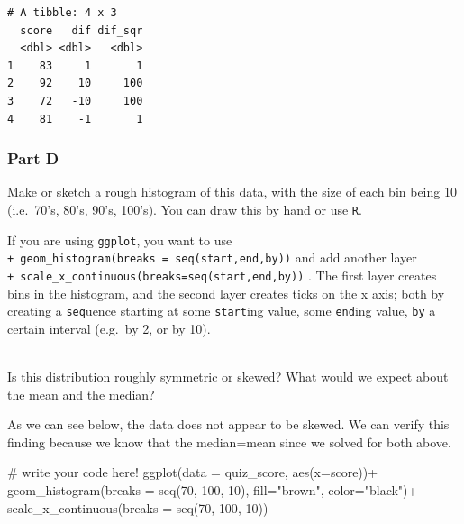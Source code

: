 \documentclass[
  letterpaper,
  DIV=11,
  numbers=noendperiod]{scrartcl}
\newenvironment{Shaded}{\begin{snugshade}}{\end{snugshade}}
\newcommand{\AttributeTok}[1]{\textcolor[rgb]{0.40,0.45,0.13}{#1}}
\newcommand{\CommentTok}[1]{\textcolor[rgb]{0.37,0.37,0.37}{#1}}
\newcommand{\DecValTok}[1]{\textcolor[rgb]{0.68,0.00,0.00}{#1}}
\newcommand{\FunctionTok}[1]{\textcolor[rgb]{0.28,0.35,0.67}{#1}}
\newcommand{\NormalTok}[1]{\textcolor[rgb]{0.00,0.23,0.31}{#1}}
\newcommand{\SpecialCharTok}[1]{\textcolor[rgb]{0.37,0.37,0.37}{#1}}
\newcommand{\StringTok}[1]{\textcolor[rgb]{0.13,0.47,0.30}{#1}}
\begin{document}
\begin{verbatim}
# A tibble: 4 x 3
  score   dif dif_sqr
  <dbl> <dbl>   <dbl>
1    83     1       1
2    92    10     100
3    72   -10     100
4    81    -1       1
\end{verbatim}

\hypertarget{part-d}{%
\subsubsection{Part D}\label{part-d}}

Make or sketch a rough histogram of this data, with the size of each bin
being 10 (i.e.~70's, 80's, 90's, 100's). You can draw this by hand or
use \texttt{R}.

If you are using \texttt{ggplot}, you want to use
\texttt{+\ geom\_histogram(breaks\ =\ seq(start,end,by))} and add
another layer \texttt{+\ scale\_x\_continuous(breaks=seq(start,end,by))}
. The first layer creates bins in the histogram, and the second layer
creates ticks on the x axis; both by creating a \texttt{seq}uence
starting at some \texttt{start}ing value, some \texttt{end}ing value,
\texttt{by} a certain interval (e.g.~by 2, or by 10).\\
\strut \\
Is this distribution roughly symmetric or skewed? What would we expect
about the mean and the median?

As we can see below, the data does not appear to be skewed. We can
verify this finding because we know that the median=mean since we solved
for both above.

\begin{Shaded}
\begin{Highlighting}[]
\CommentTok{\# write your code here!}
\FunctionTok{ggplot}\NormalTok{(}\AttributeTok{data =}\NormalTok{ quiz\_score, }\FunctionTok{aes}\NormalTok{(}\AttributeTok{x=}\NormalTok{score))}\SpecialCharTok{+}
  \FunctionTok{geom\_histogram}\NormalTok{(}\AttributeTok{breaks =} \FunctionTok{seq}\NormalTok{(}\DecValTok{70}\NormalTok{, }\DecValTok{100}\NormalTok{, }\DecValTok{10}\NormalTok{), }\AttributeTok{fill=}\StringTok{"brown"}\NormalTok{, }\AttributeTok{color=}\StringTok{"black"}\NormalTok{)}\SpecialCharTok{+}
  \FunctionTok{scale\_x\_continuous}\NormalTok{(}\AttributeTok{breaks =} \FunctionTok{seq}\NormalTok{(}\DecValTok{70}\NormalTok{, }\DecValTok{100}\NormalTok{, }\DecValTok{10}\NormalTok{))}
\end{Highlighting}
\end{Shaded}
\end{document}
